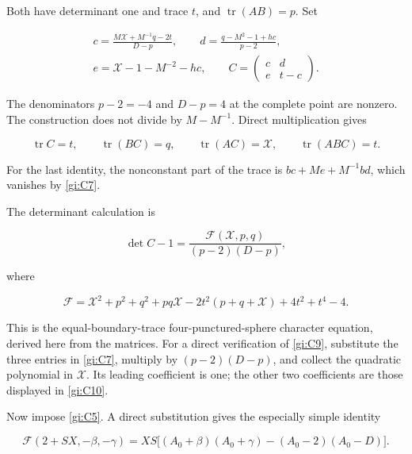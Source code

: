 Both have determinant one and trace \(t\), and \(\operatorname{tr}(AB)=p\). Set

\begin{equation}\label{gi:C7}
\begin{gathered}
 c=\frac{M\mathcal X+M^{-1}q-2t}{D-p},\qquad
 d=\frac{q-M^2-1+hc}{p-2},\\
 e=\mathcal X-1-M^{-2}-hc,\qquad
 C=\begin{pmatrix}c&d\\e&t-c\end{pmatrix}.
 \end{gathered}
\end{equation}

The denominators \(p-2=-4\) and \(D-p=4\) at the complete point are nonzero. The construction does not divide by \(M-M^{-1}\). Direct multiplication gives

\begin{equation}\label{gi:C8}
\operatorname{tr}C=t,\qquad
 \operatorname{tr}(BC)=q,\qquad
 \operatorname{tr}(AC)=\mathcal X,\qquad
 \operatorname{tr}(ABC)=t.
\end{equation}

For the last identity, the nonconstant part of the trace is
\(bc+Me+M^{-1}bd\), which vanishes by \eqref{gi:C7}.

The determinant calculation is

\begin{equation}\label{gi:C9}
\det C-1=\frac{\mathcal F(\mathcal X,p,q)}{(p-2)(D-p)},
\end{equation}

where

\begin{equation}\label{gi:C10}
\mathcal F=
 \mathcal X^2+p^2+q^2+pq\mathcal X-2t^2(p+q+\mathcal X)+4t^2+t^4-4.
\end{equation}

This is the equal-boundary-trace four-punctured-sphere character equation, derived here from the matrices. For a direct verification of \eqref{gi:C9}, substitute the three entries in \eqref{gi:C7}, multiply by \((p-2)(D-p)\), and collect the quadratic polynomial in \(\mathcal X\). Its leading coefficient is one; the other two coefficients are those displayed in \eqref{gi:C10}.

Now impose \eqref{gi:C5}. A direct substitution gives the especially simple identity

\begin{equation}\label{gi:C11}
\mathcal F(2+SX,-\beta,-\gamma)
 =XS\bigl[(A_0+\beta)(A_0+\gamma)
                         -(A_0-2)(A_0-D)\bigr].
\end{equation}

